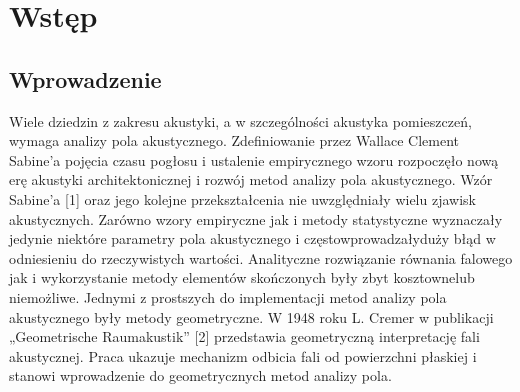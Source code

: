 \chapter{Wstęp}\label{cha:wstep}


\section{Wprowadzenie}\label{sec:wprowadzenie}

Wiele  dziedzin z zakresu akustyki, a w szczególności akustyka pomieszczeń, wymaga analizy pola akustycznego. Zdefiniowanie przez Wallace Clement Sabine’a pojęcia czasu pogłosu i ustalenie empirycznego wzoru rozpoczęło nową erę akustyki architektonicznej i rozwój metod analizy pola akustycznego. Wzór Sabine'a [1] oraz jego kolejne przekształcenia nie uwzględniały wielu zjawisk akustycznych. Zarówno wzory empiryczne  jak i metody statystyczne wyznaczały jedynie niektóre parametry pola akustycznego i częstowprowadzałyduży błąd w odniesieniu do rzeczywistych wartości. Analityczne rozwiązanie równania falowego  jak i wykorzystanie metody elementów skończonych były zbyt kosztownelub niemożliwe. Jednymi z prostszych do implementacji metod analizy pola akustycznego były metody geometryczne. W 1948 roku L. Cremer w publikacji „Geometrische Raumakustik” [2] przedstawia geometryczną interpretację fali akustycznej. Praca ukazuje mechanizm odbicia fali od powierzchni płaskiej i stanowi wprowadzenie do geometrycznych metod analizy pola.

